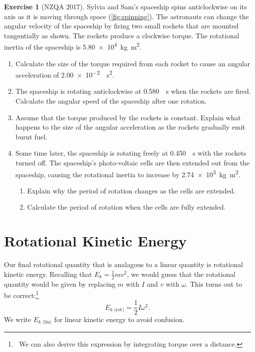 \documentclass[a4paper]{amsbook}
\newcommand{\ekl}{E_{k \text{ (lin)}}}
\newcommand{\ekr}{E_{k \text{ (rot)}}}
\theoremstyle{definition}
\newtheorem{exercise}{Exercise}
\numberwithin{exercise}{chapter}
\numberwithin{exercise}{chapter}
\begin{document}
\begin{exercise} [NZQA 2017]
  Sylvia and Sam's spaceship spins anticlockwise on its axis as it is moving through space (\cref{fig:spinning}). The astronauts can change
  the angular velocity of the spaceship by firing two small rockets that are mounted tangentially as shown. The rockets produce a clockwise
  torque. The rotational inertia of the spaceship is \SI{5.80e4}{\kilo\gram\metre\squared}.
  \begin{enumerate}
    \item Calculate the size of the torque required from each rocket to cause an angular acceleration of \SI{2.00e-2}{\per\second\squared}.
    \item The spaceship is rotating anticlockwise at \SI{0.580}{\per\second} when the rockets are fired. Calculate the angular speed of the
          spaceship after one rotation.
    \item Assume that the torque produced by the rockets is constant. Explain what happens to the size of the angular acceleration as the
          rockets gradually emit burnt fuel.
    \item Some time later, the spaceship is rotating freely at \SI{0.450}{\per\second} with the rockets turned off. The spaceship's photo-voltaic
          cells are then extended out from the spaceship, causing the rotational inertia to increase by \SI{2.74e3}{\kilo\gram\metre\squared}.
      \begin{enumerate}
        \item Explain why the period of rotation changes as the cells are extended.
        \item Calculate the period of rotation when the cells are fully extended.
      \end{enumerate}
  \end{enumerate}
\end{exercise}

\section{Rotational Kinetic Energy}
Our final rotational quantity that is analagous to a linear quantity is rotational kinetic energy. Recalling that $ E_k = \frac{1}{2} mv^2 $,
we would guess that the rotational quantity would be given by replacing $ m $ with $ I $ and $ v $ with $ \omega $. This turns out to be
correct:\footnote{~We can also derive this expression by integrating torque over a distance.}
\begin{equation}
  \ekr = \frac{1}{2} I \omega^2.
\end{equation}
We write $ \ekl $ for linear kinetic energy to avoid confusion.
\end{document}
